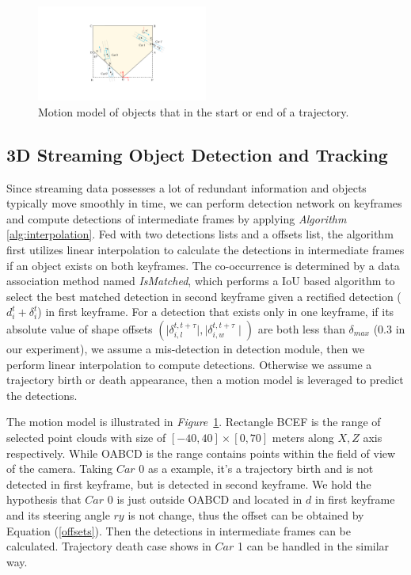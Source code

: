 \documentclass[letterpaper, 10 pt, conference]{ieeeconf}  %
\def\figurename{\emph{Figure}}
\begin{document}
\begin{figure}
	\vspace{-0.6cm}
	\rule{0pt}{1ex}
	\begin{center}
		\includegraphics[trim={10cm, 4cm, 8cm, 3.5cm}, clip, width=0.5\textwidth]{images/motion.pdf}
	\end{center}
	\caption{Motion model of objects that in the start or end of a trajectory.}
	\label{fig:motion}
	\vspace{-0.6cm}
\end{figure}

\subsection{3D Streaming Object Detection and Tracking}
Since streaming data possesses a lot of redundant information and objects typically move smoothly in time, we can perform detection network on keyframes and compute detections of intermediate frames by applying \textit{Algorithm} \ref{alg:interpolation}. Fed with two detections lists and a offsets list, the algorithm first utilizes linear interpolation to calculate the detections in intermediate frames if an object exists on both keyframes. The co-occurrence is determined by a data association method named \textit{IsMatched}, which performs a IoU based algorithm to select the best matched detection in second keyframe given a rectified detection ($d_i^t + \delta_i^t$) in first keyframe. For a detection that exists only in one keyframe, if its absolute value of shape offsets $(\mid \delta^{t,t+\tau}_{i,l} \mid, \mid \delta^{t,t+\tau}_{i,w} \mid)$ are both less than $\delta_{max}$ (0.3 in our experiment), we assume a mis-detection in detection module, then we perform linear interpolation to compute detections. Otherwise we assume a trajectory birth or death appearance, then a motion model is leveraged to predict the detections.

The motion model is illustrated in \figurename \, \ref{fig:motion}. Rectangle BCEF is the range of selected point clouds with size of $[-40,40] \times [0, 70]$ meters along $X, Z$ axis respectively. While OABCD is the range contains points within the field of view of the camera. Taking $Car$ 0 as a example, it's a trajectory birth and is not detected in first keyframe, but is detected in second keyframe. We hold the hypothesis that $Car$ 0 is just outside OABCD and located in $d$ in first keyframe and its steering angle $ry$ is not change, thus the offset can be obtained by Equation (\ref{offsets}). Then the detections in intermediate frames can be calculated. Trajectory death case shows in $Car$ 1 can be handled in the similar way. 
\end{document}
